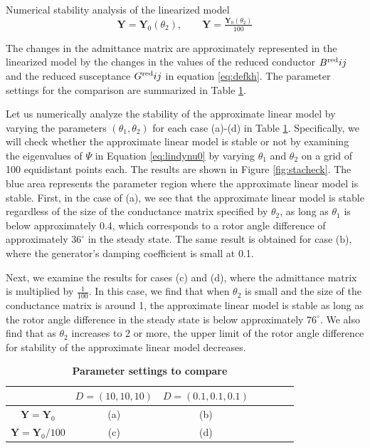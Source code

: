 \documentclass[graybox, envcountchap]{svmult}
\begin{document}
\begin{example}{Numerical stability analysis of the linearized model}
\begin{equation*}
  \bm{Y} = \bm{Y}_0(\theta_2)
  ,\qquad
  \bm{Y} = \tfrac{\bm{Y}_0(\theta_2)}{100}
\end{equation*}

The changes in the admittance matrix are approximately represented in the
linearized model by the changes in the values of the reduced conductor $B^{\rm
red}{ij}$ and the reduced susceptance $G^{\rm red}{ij}$ in equation
\ref{eq:defkh}. The parameter settings for the comparison are summarized in
Table \ref{table:parasetcom}.

Let us numerically analyze the stability of the approximate linear model by
varying the parameters $(\theta_1, \theta_2)$ for each case (a)-(d) in Table
\ref{table:parasetcom}. Specifically, we will check whether the approximate
linear model is stable or not by examining the eigenvalues of $\Psi$ in Equation
\ref{eq:lindynu0} by varying $\theta_1$ and $\theta_2$ on a grid of 100
equidistant points each. The results are shown in Figure \ref{fig:stacheck}. The
blue area represents the parameter region where the approximate linear model is
stable. First, in the case of (a), we see that the approximate linear model is
stable regardless of the size of the conductance matrix specified by $\theta_2$,
as long as $\theta_1$ is below approximately 0.4, which corresponds to a rotor
angle difference of approximately $36^\circ$ in the steady state. The same
result is obtained for case (b), where the generator's damping coefficient is
small at 0.1.

Next, we examine the results for cases (c) and (d), where the admittance matrix
is multiplied by $\tfrac{1}{100}$. In this case, we find that when $\theta_2$
is small and the size of the conductance matrix is around 1, the approximate
linear model is stable as long as the rotor angle difference in the steady state
is below approximately $76^\circ$. We also find that as $\theta_2$ increases to
2 or more, the upper limit of the rotor angle difference for stability of the
approximate linear model decreases.
\end{example}

\begin{table}[h]
\medskip
 \caption{\textbf{Parameter settings to compare}}
 \label{table:parasetcom}
 \centering
  \begin{tabular}{|c|c|c|c|c|c|c|}
   \hline
 &    $D=(10,10,10)$ &   $D=(0.1,0.1,0.1)$ \\
   \hline 
 $\bm{Y} =\bm{Y}_0$ & (a) & (b) \\
   \hline
 $\bm{Y} = \bm{Y}_0/100  $  & (c) & (d) \\
   \hline
  \end{tabular}
\end{table}
\end{document}
